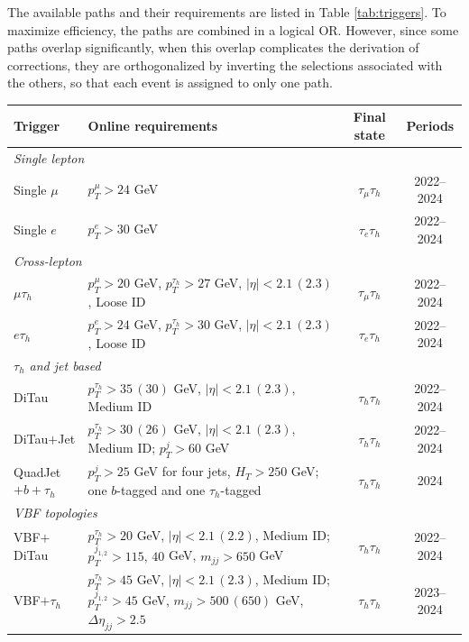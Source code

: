The available paths and their requirements are listed in Table \ref{tab:triggers}. To maximize efficiency, the paths are combined in a logical OR. However, since some paths overlap significantly, when this overlap complicates the derivation of corrections, they are orthogonalized by inverting the selections associated with the others, so that each event is assigned to only one path.
\begin{table}[t]
\centering
\small
\begin{tabular}{l p{5.4cm} c c}
\toprule
\textbf{Trigger} & \textbf{Online requirements} & \textbf{Final state} & \textbf{Periods} \\
\midrule
\midrule
\multicolumn{4}{l}{\textit{Single lepton}} \\
\midrule
\quad Single $\mu$ & $p_{T}^{\mu} > 24$ GeV  & $\tau_\mu\tau_h$ & 2022--2024 \\
\quad Single $e$   & $p_{T}^{e} > 30$ GeV   & $\tau_e\tau_h$   & 2022--2024 \\
\midrule
\multicolumn{4}{l}{\textit{Cross-lepton}} \\
\midrule
\quad $\mu\tau_{h}$ & $p_{T}^{\mu} > 20$ GeV, $p_{T}^{\tau_h} > 27$ GeV, $|\eta| < 2.1\,(2.3)$, Loose ID & $\tau_\mu\tau_h$ & 2022--2024 \\
\quad $e\tau_{h}$   & $p_{T}^{e} > 24$ GeV, $p_{T}^{\tau_h} > 30$ GeV, $|\eta| < 2.1\,(2.3)$, Loose ID & $\tau_e\tau_h$ & 2022--2024 \\
\midrule
\multicolumn{4}{l}{\textit{$\tau_{h}$ and jet based}} \\
\midrule
\quad DiTau       & $p_{T}^{\tau_h} > 35\,(30)$ GeV, $|\eta| < 2.1\,(2.3)$, Medium ID & $\tau_h\tau_h$ & 2022--2024 \\
\quad DiTau$+$Jet & $p_{T}^{\tau_h} > 30\,(26)$ GeV, $|\eta| < 2.1\,(2.3)$, Medium ID; $p_{T}^{j} > 60$ GeV & $\tau_h\tau_h$ & 2022--2024 \\
\quad QuadJet$+b+\tau_{h}$ & $p_{T}^{j} > 25$ GeV for four jets, $H_{T} > 250$ GeV; one $b$-tagged and one $\tau_{h}$-tagged & $\tau_h\tau_h$ & 2024 \\
\midrule
\multicolumn{4}{l}{\textit{VBF topologies}} \\
\midrule
\quad VBF$+$DiTau & $p_{T}^{\tau_h} > 20$ GeV, $|\eta| < 2.1\,(2.2)$, Medium ID; $p_{T}^{j_{1,2}} > 115,\,40$ GeV, $m_{jj} > 650$ GeV & $\tau_h\tau_h$ & 2022--2024 \\
\quad VBF$+\tau_{h}$ & $p_{T}^{\tau_h} > 45$ GeV, $|\eta| < 2.1\,(2.3)$, Medium ID; $p_{T}^{j_{1,2}} > 45$ GeV, $m_{jj} > 500\,(650)$ GeV, $\Delta\eta_{jj} > 2.5$ & $\tau_h\tau_h$ & 2023--2024 \\

\end{tabular}
\end{table}
